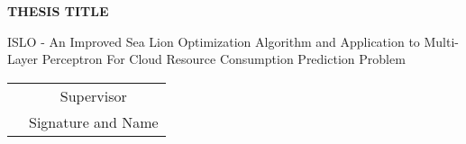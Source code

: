 \documentclass[../main.tex]{subfiles}
\begin{document}
\begin{center}
    \textbf{THESIS TITLE}\
\end{center}
ISLO - An Improved Sea Lion Optimization Algorithm and Application to Multi-Layer Perceptron For Cloud Resource Consumption Prediction Problem

\vspace{15cm}


\begin{table}[H]
\centering
\begin{tabular}{p{5cm} c}
\multicolumn{1}{c}{\textbf{}} & Supervisor \\
\textbf{}                     & \small{Signature and Name}
\end{tabular}
\end{table}
\end{document}
